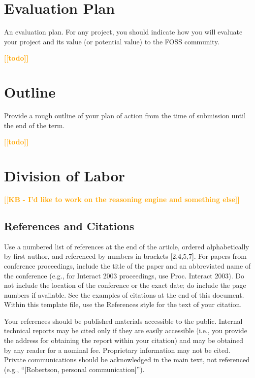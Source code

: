 \documentclass{chi2009}
\newcommand{\todo}[1]{\textsf{\textbf{\textcolor{Orange}{[[#1]]}}}}
\begin{document}
\section{Evaluation Plan}

An evaluation plan. For any project, you should indicate how you will evaluate your project and its value (or potential value) to the FOSS community.

\todo{todo}

\section{Outline}
Provide a rough outline of your plan of action from the time of submission until the end of the term.

\todo{todo}

\section{Division of Labor}

\todo{KB - I'd like to work on the reasoning engine and something else}

\subsection{References and Citations}

Use a numbered list of references at the end of the article, ordered
alphabetically by first author, and referenced by numbers in brackets
[2,4,5,7]. For papers from conference proceedings, include the title
of the paper and an abbreviated name of the conference (e.g., for
Interact 2003 proceedings, use Proc. Interact 2003). Do not include
the location of the conference or the exact date; do include the page
numbers if available. See the examples of citations at the end of this
document. Within this template file, use the References style for the
text of your citation.

Your references should be published materials accessible to the
public.  Internal technical reports may be cited only if they are
easily accessible (i.e., you provide the address for obtaining the
report within your citation) and may be obtained by any reader for a
nominal fee.  Proprietary information may not be cited. Private
communications should be acknowledged in the main text, not referenced
(e.g., ``[Robertson, personal communication]'').




\end{document}
